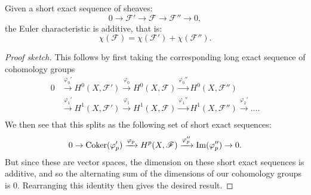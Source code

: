 \begin{theorem} \label{thm:eulercharadditive}
  Given a short exact sequence of sheaves:
  \[
  0 \rightarrow \mathscr{F}' \rightarrow \mathscr{F} \rightarrow \mathscr{F}'' \rightarrow 0,
  \]
  the Euler characteristic is additive, that is:
  \[
  \chi(\mathscr{F}) = \chi(\mathscr{F}') + \chi(\mathscr{F}'').
  \]
\end{theorem}
  \begin{proof}[Proof sketch]
    This follows by first taking the corresponding long exact sequence of cohomology groups
    \[
    \begin{split}
    0 &\xrightarrow{\varphi_0'} H^0(X, \mathscr{F'}) \xrightarrow{\varphi_0}  H^0(X, \mathscr{F}) \xrightarrow{\varphi_0''}  H^0(X, \mathscr{F''})\\
    &\xrightarrow{\varphi_1'} H^1(X, \mathscr{F'}) \xrightarrow{\varphi_1} H^1(X, \mathscr{F}) \xrightarrow{\varphi_1''} H^1(X, \mathscr{F''}) \xrightarrow{\varphi_2'} ....\\
    \end{split}
    \]
    We then see that this splits as the following set of short exact sequences:
    \[
    0 \rightarrow \operatorname{Coker}(\varphi_p') \xrightarrow{\varphi_p} H^p(X, \mathscr{F}) \xrightarrow{\varphi_p''} \operatorname{Im}(\varphi_p'') \rightarrow 0.
    \]
    But since these are vector spaces, the dimension on these short exact sequences is additive, and so the alternating sum of the dimensions of our cohomology groups is $0$. Rearranging this identity then gives the desired result.
\end{proof}

